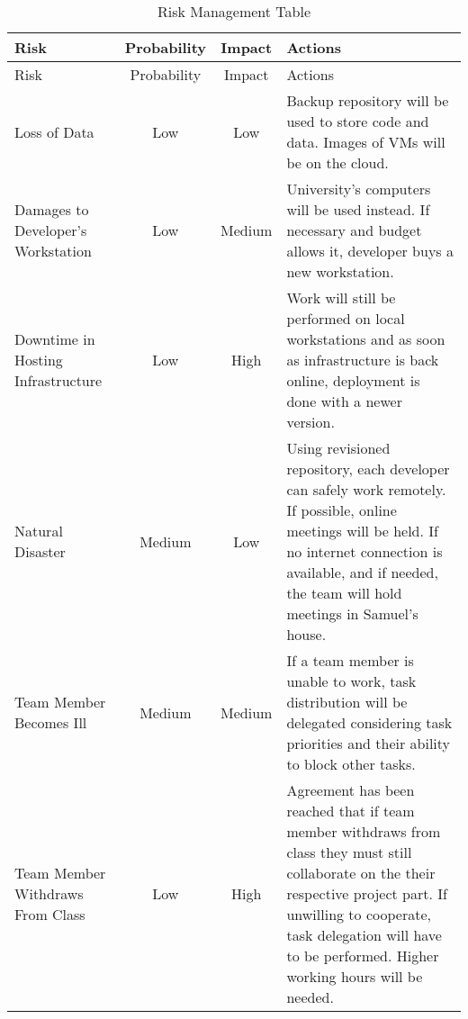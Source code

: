 \begin{center}
\setlength{\extrarowheight}{1.5pt}
    \begin{longtable}{|m{5cm}|c|c|m{5cm}|}
 \caption{Risk Management Table} \\
     \hline
    
    \centering  Risk & Probability & Impact & Actions \\
    \hline \hline \endfirsthead
    
         \hline

	\centering  Risk & Probability & Impact & Actions \\    
	\hline \hline \endhead
    
    \endfoot  
Loss of Data    & Low           & Low      & Backup repository will be used to store code and data. Images of VMs will be on the cloud.       \\ \hline
Damages to Developer's Workstation  & Low           & Medium      & University's computers will be used instead. If necessary and budget allows it, developer buys a new workstation.       \\  \hline
    Downtime in Hosting Infrastructure & Low           & High      & Work will still be performed on local workstations and as soon as infrastructure is back online, deployment is done with a newer version.       \\  \hline
    Natural Disaster    & Medium           & Low      & Using revisioned repository, each developer can safely work remotely. If possible, online meetings will be held. If no internet connection is available, and if needed, the team will hold meetings in Samuel's house.       \\  \hline
    Team Member Becomes Ill    & Medium           & Medium      & If a team member is unable to work, task distribution will be delegated considering task priorities and their ability to block other tasks.       \\  \hline
    Team Member Withdraws From Class   & Low           & High      & Agreement has been reached that if team member withdraws from class they must still collaborate on the their respective project part. If unwilling to cooperate, task delegation will have to be performed. Higher working hours will be needed.       \\  \hline
\end{longtable}
\end{center}
